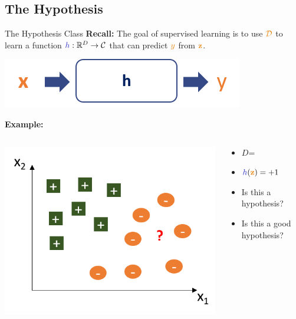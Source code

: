 \documentclass[aspectratio=169,10pt]{beamer}
\begin{document}
\subsection{The Hypothesis}
\begin{frame}{The Hypothesis Class}
	\alert{\textbf{Recall:}} The goal of supervised learning is to use $\trainset$ to learn a function $\hypothesis: \mathbb{R}^D \rightarrow \mathcal{C}$ that can predict $\smally$ from $\boldx$. \\
	\begin{center}
		\includegraphics[width=0.4\linewidth, clip]{images/hypothesis}
	\end{center}
\pause
	\alert{\textbf{Example:}}  
	\begin{columns}
		\begin{column}[c]{0.45\paperwidth}
			\includegraphics[width=0.7\linewidth, clip]{images/example_hypothesis}	
		\end{column}
	
	\begin{column}{0.45\paperwidth}
		\begin{itemize}
			\item $D$=
			\pause
			\item $\hypothesis(\boldx) = +1$
			\item Is this a hypothesis?
			\pause
			\item Is this a good hypothesis? 
		\end{itemize}
	\end{column}

\end{columns}
\end{frame}	
\end{document}
